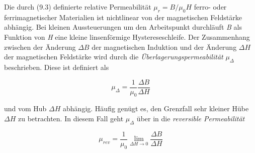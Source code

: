 \documentclass[
  ngerman,
  letterpaper,
]{scrbook}
\begin{document}
\begin{tcolorbox}[enhanced jigsaw, titlerule=0mm, rightrule=.15mm, toprule=.15mm, colback=white, toptitle=1mm, bottomrule=.15mm, coltitle=black, leftrule=.75mm, arc=.35mm, colbacktitle=quarto-callout-note-color!10!white, opacityback=0, bottomtitle=1mm, colframe=quarto-callout-note-color-frame, opacitybacktitle=0.6, breakable, title=\textcolor{quarto-callout-note-color}{\faInfo}\hspace{0.5em}{Permeabilität}, left=2mm]

Die durch (9.3) definierte relative Permeabilität \(\mu_r = B/\mu_0 H\)
ferro- oder ferrimagnetischer Materialien ist nichtlinear von der
magnetischen Feldstärke abhängig. Bei kleinen Aussteuerungen um den
Arbeitspunkt durchläuft \emph{B} als Funktion von \emph{H} eine kleine
linsenförmige Hystereseschleife. Der Zusammenhang zwischen der Änderung
\(\Delta B\) der magnetischen Induktion und der Änderung \(\Delta H\)
der magnetischen Feldstärke wird durch die
\emph{Überlagerungspermeabilität} \(\mu_{\Delta}\) beschrieben. Diese
ist definiert als

\[
\mu_{\Delta} = \frac{1}{\mu_0} \frac{\Delta B}{\Delta H}
\]

und vom Hub \(\Delta H\) abhängig. Häufig genügt es, den Grenzfall sehr
kleiner Hübe \(\Delta H\) zu betrachten. In diesem Fall geht
\(\mu_{\Delta}\) über in die \emph{reversible Permeabilität}

\[
\mu_{rev} = \frac{1}{\mu_0} \lim_{\Delta H \to 0} \frac{\Delta B}{\Delta H}
\]

\end{tcolorbox}
\end{document}

